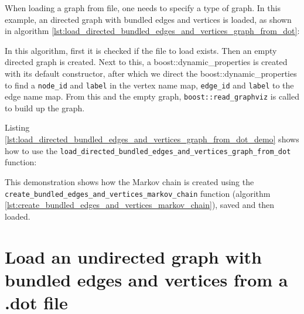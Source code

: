 When loading a graph from file, one needs to specify a type of graph.
In this example, an directed graph with bundled edges and vertices is loaded,
as shown in algorithm \ref{lst:load_directed_bundled_edges_and_vertices_graph_from_dot}:



In this algorithm, first it is checked if the file to load exists.
Then an empty directed graph is created.
Next to this, a boost::dynamic\_properties 
is created with its default constructor, after which we direct the 
boost::dynamic\_properties 
to find a \verb;node_id; and \verb;label; in the vertex name map, 
\verb;edge_id; and \verb;label; to the edge name map.
 From this and the empty graph, \verb;boost::read_graphviz;
is called to build up the graph.

Listing 
\ref{lst:load_directed_bundled_edges_and_vertices_graph_from_dot_demo}
shows how to use the \verb;load_directed_bundled_edges_and_vertices_graph_from_dot;
function:



This demonstration shows how the Markov chain is created using 
the \verb;create_bundled_edges_and_vertices_markov_chain; function 
(algorithm \ref{lst:create_bundled_edges_and_vertices_markov_chain}), 
saved and then loaded.

\section{Load an undirected graph with bundled edges and vertices from a .dot file}
\label{subsec:load_undirected_bundled_edges_and_vertices_graph_from_dot}

